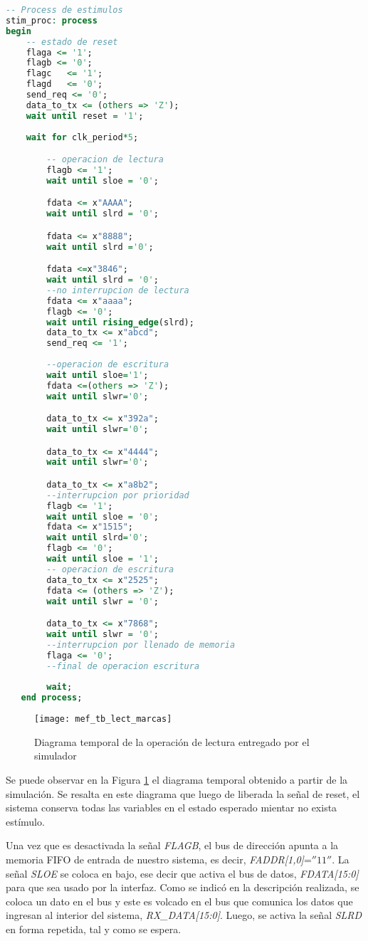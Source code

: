 \begin{lstlisting}[language=VHDL,backgroundcolor=\color{gray!30}]
-- Process de estimulos
stim_proc: process
begin	
	-- estado de reset	
	flaga <= '1';
	flagb <= '0';
	flagc	<= '1';
	flagd	<= '0';
	send_req <= '0';
	data_to_tx <= (others => 'Z');
	wait until reset = '1';
	
	wait for clk_period*5;	

		-- operacion de lectura
		flagb <= '1';
		wait until sloe = '0';

		fdata <= x"AAAA";
		wait until slrd = '0';	

		fdata <= x"8888";
		wait until slrd ='0';

		fdata <=x"3846";
		wait until slrd = '0';
		--no interrupcion de lectura
		fdata <= x"aaaa";
		flagb <= '0';
		wait until rising_edge(slrd);		
		data_to_tx <= x"abcd";
		send_req <= '1';
		
		--operacion de escritura
		wait until sloe='1';
		fdata <=(others => 'Z');
		wait until slwr='0';

		data_to_tx <= x"392a";
		wait until slwr='0';

		data_to_tx <= x"4444";
		wait until slwr='0';

		data_to_tx <= x"a8b2";
		--interrupcion por prioridad
		flagb <= '1';
		wait until sloe = '0';
		fdata <= x"1515";
		wait until slrd='0';
		flagb <= '0';
		wait until sloe = '1';
		-- operacion de escritura
		data_to_tx <= x"2525";
		fdata <= (others => 'Z');
		wait until slwr = '0';

		data_to_tx <= x"7868";
		wait until slwr = '0';
		--interrupcion por llenado de memoria
		flaga <= '0';
		--final de operacion escritura
		
		wait;
   end process;
\end{lstlisting}

\begin{figure}[ht]
	\centering
	\texttt{[image: mef\_tb\_lect\_marcas]}
	\caption{Diagrama temporal de la operación de lectura entregado por el simulador}
	\label{tb:lect}
\end{figure}

Se puede observar en la Figura \ref{tb:lect} el diagrama temporal obtenido a partir de la simulación. Se resalta en este diagrama que luego de liberada  la señal de reset, el sistema conserva todas las variables en el estado esperado mientar no exista estímulo.

Una vez que es desactivada la señal {\it FLAGB}, el bus de dirección apunta a la memoria FIFO de entrada de nuestro sistema, es decir, {\it FADDR[1,0]}=$''11''$. La señal {\it SLOE} se coloca en bajo, ese decir que activa el bus de datos, {\it FDATA[15:0]} para que sea usado por la interfaz. Como se indicó en la descripción realizada, se coloca un dato en el bus y este es volcado en el bus que comunica los datos que ingresan al interior del sistema, {\it RX\_DATA[15:0]}. Luego, se activa la señal {\it SLRD} en forma repetida, tal y como se espera.

